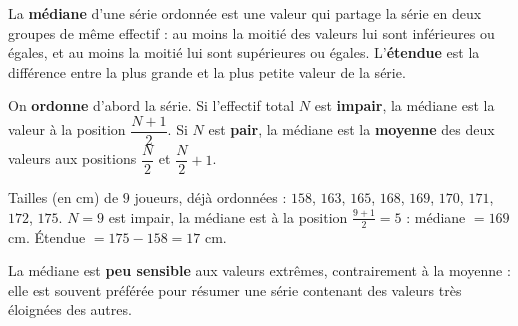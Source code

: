 \begin{definition}
La \textbf{médiane} d'une série ordonnée est une valeur qui partage la série en deux
groupes de même effectif : au moins la moitié des valeurs lui sont inférieures ou égales,
et au moins la moitié lui sont supérieures ou égales. L'\textbf{étendue} est la différence
entre la plus grande et la plus petite valeur de la série.
\end{definition}

\begin{propriete}
On \textbf{ordonne} d'abord la série. Si l'effectif total $N$ est \textbf{impair}, la
médiane est la valeur à la position $\dfrac{N+1}{2}$. Si $N$ est \textbf{pair}, la médiane
est la \textbf{moyenne} des deux valeurs aux positions $\dfrac{N}{2}$ et $\dfrac{N}{2}+1$.
\end{propriete}

\begin{illus}
\end{illus}

\begin{exemple}
Tailles (en cm) de $9$ joueurs, déjà ordonnées : $158$, $163$, $165$, $168$, $169$, $170$,
$171$, $172$, $175$.
$N=9$ est impair, la médiane est à la position $\frac{9+1}{2}=5$ : médiane $=169$ cm.
Étendue $=175-158=17$ cm.
\end{exemple}

\begin{remarque}
La médiane est \textbf{peu sensible} aux valeurs extrêmes, contrairement à la moyenne : elle
est souvent préférée pour résumer une série contenant des valeurs très éloignées des
autres.
\end{remarque}

